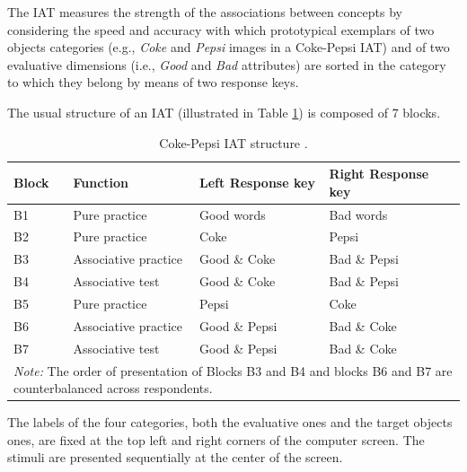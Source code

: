 \documentclass[12pt]{book}
\begin{document}
The IAT measures the strength of the associations between concepts by considering the speed and accuracy with which prototypical exemplars of two objects  categories (e.g., \emph{Coke} and \emph{Pepsi} images in a Coke-Pepsi IAT) and of two evaluative dimensions (i.e., \emph{Good} and \emph{Bad} attributes) are sorted in the category to which they belong by means of two response keys. 

The usual structure of an IAT (illustrated in Table \ref{tab:iatstructure}) is composed of 7 blocks.


\begin{table}[h!]
	\centering \doublespacing
	\caption{Coke-Pepsi IAT structure \protect\cite<adapted from >{Greenwald2003}.}
	\label{tab:iatstructure}
	\begin{tabular}{p{1cm}  p{4cm} p{4cm} p{4cm}}
		\toprule
		Block  & Function  & Left Response key & Right Response key \\
		\midrule
		B1  & Pure practice & Good words & Bad words \\
		B2  & Pure practice & Coke & Pepsi \\
		B3  & Associative practice & Good \& Coke & Bad \& Pepsi \\
		B4 & Associative test & Good \& Coke & Bad \& Pepsi \\
		B5 & Pure practice & Pepsi & Coke \\
		B6 & Associative practice & Good \& Pepsi & Bad \& Coke \\
		B7 & Associative test & Good \& Pepsi & Bad \& Coke \\
		\bottomrule
		\multicolumn{4}{p{14cm}}{\onehalfspacing\emph{Note:} The order of presentation of Blocks B3 and B4 and blocks B6 and B7 are counterbalanced across respondents.}
	\end{tabular}
\end{table}

The labels of the four categories, both the evaluative ones and the target objects ones, are fixed at the top left and right corners of the computer screen. 
	The stimuli are presented sequentially at the center of the screen. 
	
\end{document}
